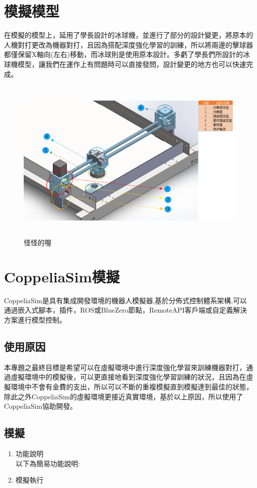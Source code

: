 \documentclass[14pt,a4paper]{report}  %
\begin{document}
\section{模擬模型}
 在模擬的模型上，延用了學長設計的冰球機，並進行了部分的設計變更，將原本的人機對打更改為機器對打，且因為搭配深度強化學習的訓練，所以將兩邊的擊球器都僅保留X軸向(左右)移動，而冰球則是使用原本設計。多虧了學長們所設計的冰球機模型，讓我們在運作上有問題時可以直接發問，設計變更的地方也可以快速完成。\\
\begin{figure}[hbt!]
\begin{center}
\includegraphics[height=8cm]{model}
\caption{怪怪的喔~}
\end{center}
\end{figure}
\section{CoppeliaSim模擬}
 CoppeliaSim是具有集成開發環境的機器人模擬器,基於分佈式控制體系架構,可以通過嵌入式腳本，插件，ROS或BlueZero節點，RemoteAPI客戶端或自定義解決方案進行模型控制。\\
\subsection{使用原因}
 本專題之最終目標是希望可以在虛擬環境中進行深度強化學習來訓練機器對打，通過虛擬環境中的模擬後，可以更直接地看到深度強化學習訓練的狀況，且因為在虛擬環境中不會有金費的支出，所以可以不斷的重複模擬直到模擬達到最佳的狀態，除此之外CoppeliaSim的虛擬環境更接近真實環境，基於以上原因，所以使用了CoppeliaSim協助開發。\\
\subsection{模擬}
\begin{enumerate}

\item 功能說明\\
以下為簡易功能說明:
\item 模擬執行\\

\end{enumerate}
\end{document}

